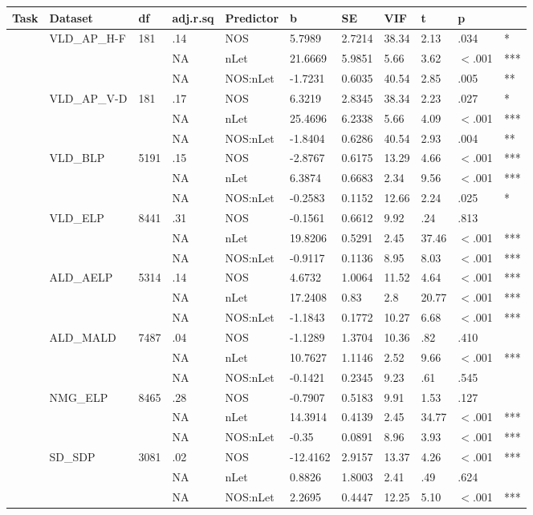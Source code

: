 \begin{table}[ht]
\centering
\begingroup\normalsize
\begin{tabular}{lllllllllll}
  \hline
Task & Dataset & df & adj.r.sq & Predictor & b & SE & VIF & t & p &  \\ 
  \hline
 & VLD\_AP\_H-F & 181 & .14 & NOS & 5.7989 & 2.7214 & 38.34 & 2.13 & .034 & * \\ 
   &  &  & NA & nLet & 21.6669 & 5.9851 & 5.66 & 3.62 & $<$.001 & *** \\ 
   &  &  & NA & NOS:nLet & -1.7231 & 0.6035 & 40.54 & 2.85 & .005 & ** \\ 
   & VLD\_AP\_V-D & 181 & .17 & NOS & 6.3219 & 2.8345 & 38.34 & 2.23 & .027 & * \\ 
   &  &  & NA & nLet & 25.4696 & 6.2338 & 5.66 & 4.09 & $<$.001 & *** \\ 
   &  &  & NA & NOS:nLet & -1.8404 & 0.6286 & 40.54 & 2.93 & .004 & ** \\ 
   & VLD\_BLP & 5191 & .15 & NOS & -2.8767 & 0.6175 & 13.29 & 4.66 & $<$.001 & *** \\ 
   &  &  & NA & nLet & 6.3874 & 0.6683 & 2.34 & 9.56 & $<$.001 & *** \\ 
   &  &  & NA & NOS:nLet & -0.2583 & 0.1152 & 12.66 & 2.24 & .025 & * \\ 
   & VLD\_ELP & 8441 & .31 & NOS & -0.1561 & 0.6612 & 9.92 & .24 & .813 &   \\ 
   &  &  & NA & nLet & 19.8206 & 0.5291 & 2.45 & 37.46 & $<$.001 & *** \\ 
   &  &  & NA & NOS:nLet & -0.9117 & 0.1136 & 8.95 & 8.03 & $<$.001 & *** \\ 
   & ALD\_AELP & 5314 & .14 & NOS & 4.6732 & 1.0064 & 11.52 & 4.64 & $<$.001 & *** \\ 
   &  &  & NA & nLet & 17.2408 & 0.83 & 2.8 & 20.77 & $<$.001 & *** \\ 
   &  &  & NA & NOS:nLet & -1.1843 & 0.1772 & 10.27 & 6.68 & $<$.001 & *** \\ 
   & ALD\_MALD & 7487 & .04 & NOS & -1.1289 & 1.3704 & 10.36 & .82 & .410 &   \\ 
   &  &  & NA & nLet & 10.7627 & 1.1146 & 2.52 & 9.66 & $<$.001 & *** \\ 
   &  &  & NA & NOS:nLet & -0.1421 & 0.2345 & 9.23 & .61 & .545 &   \\ 
   & NMG\_ELP & 8465 & .28 & NOS & -0.7907 & 0.5183 & 9.91 & 1.53 & .127 &   \\ 
   &  &  & NA & nLet & 14.3914 & 0.4139 & 2.45 & 34.77 & $<$.001 & *** \\ 
   &  &  & NA & NOS:nLet & -0.35 & 0.0891 & 8.96 & 3.93 & $<$.001 & *** \\ 
   & SD\_SDP & 3081 & .02 & NOS & -12.4162 & 2.9157 & 13.37 & 4.26 & $<$.001 & *** \\ 
   &  &  & NA & nLet & 0.8826 & 1.8003 & 2.41 & .49 & .624 &   \\ 
   &  &  & NA & NOS:nLet & 2.2695 & 0.4447 & 12.25 & 5.10 & $<$.001 & *** \\ 
   \hline
\end{tabular}
\endgroup
\end{table}
